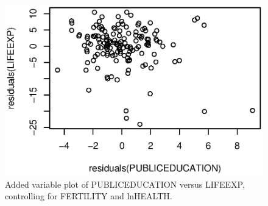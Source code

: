 \begin{exercises}
\begin{figure}[htp]
  \begin{center}
   \includegraphics[width=.6\textwidth]{Chapter3/UNLIFE2.eps}
   \caption{\label{Ex:UNLIFEPlot2} \small  Added variable plot of PUBLICEDUCATION  versus LIFEEXP,
   controlling for FERTILITY and lnHEALTH.}
  \end{center}
\end{figure}


\end{exercises}
